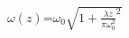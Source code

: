 \documentclass{article}
\begin{document}
$\omega (z)$=$\omega_0\sqrt{1+{\frac{\lambda z}{\pi \omega_0 ^2}^2}}$
\end{document}
